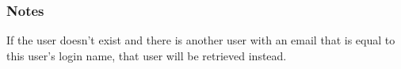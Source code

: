 \documentclass[letterpaper,10pt,english]{sphinxmanual}
\begin{document}
\begin{fulllineitems}
\begin{quote}
\begin{description}
\end{description}\end{quote}






\subsubsection*{Notes}

If the user doesn’t exist and there is another user with an email that is equal
to this user’s login name, that user will be retrieved instead.

\end{fulllineitems}

\end{document}
